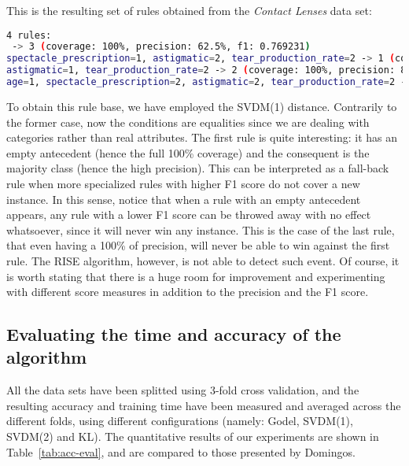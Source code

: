 \documentclass[a4paper]{article}
\begin{document}
This is the resulting set of rules obtained from the \emph{Contact Lenses} data set:
\begin{lstlisting}[language=bash,frame=single,breaklines=true]
4 rules:
 -> 3 (coverage: 100%, precision: 62.5%, f1: 0.769231)
spectacle_prescription=1, astigmatic=2, tear_production_rate=2 -> 1 (coverage: 75%, precision: 100%, f1: 0.857143)
astigmatic=1, tear_production_rate=2 -> 2 (coverage: 100%, precision: 83.3333%, f1: 0.909091)
age=1, spectacle_prescription=2, astigmatic=2, tear_production_rate=2 -> 1 (coverage: 25%, precision: 100%, f1: 0.4)
\end{lstlisting}
To obtain this rule base, we have employed the SVDM(1) distance. Contrarily to the former case, now the conditions are equalities since we are dealing with categories rather than real attributes. The first rule is quite interesting: it has an empty antecedent (hence the full 100\% coverage) and the consequent is the majority class (hence the high precision). This can be interpreted as a fall-back rule when more specialized rules with higher F1 score do not cover a new instance. In this sense, notice that when a rule with an empty antecedent appears, any rule with a lower F1 score can be throwed away with no effect whatsoever, since it will never win any instance. This is the case of the last rule, that even having a 100\% of precision, will never be able to win against the first rule. The RISE algorithm, however, is not able to detect such event. Of course, it is worth stating that there is a huge room for improvement and experimenting with different score measures in addition to the precision and the F1 score.

\subsection{Evaluating the time and accuracy of the algorithm}
\label{sec:acc-eval}

All the data sets have been splitted using 3-fold cross validation, and the resulting accuracy and training time have been measured and averaged across the different folds, using different configurations (namely: Godel, SVDM(1), SVDM(2) and KL). The quantitative results of our experiments are shown in Table~\ref{tab:acc-eval}, and are compared to those presented by Domingos.
\end{document}
